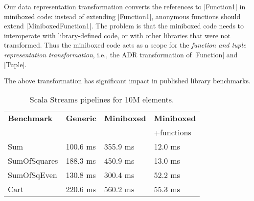 Our data representation transformation converts the references to
|Function1| in miniboxed code: instead of extending |Function1|,
anonymous functions should extend |MiniboxedFunction1|. The
problem is that the miniboxed code needs to interoperate with
library-defined code, or with other libraries that were not
transformed. Thus the miniboxed code acts
as a scope for the \emph{function and tuple representation
  transformation}, i.e., the ADR transformation of |Function| and
|Tuple|.


The above transformation has significant impact in published library benchmarks.

\begin{table}[t]
  \begin{tabularx}{0.48\textwidth}{|g *{3}{|Y}|} \hline
    \textbf{Benchmark} & \textbf{Generic} & \textbf{Miniboxed}& \textbf{Miniboxed} \\
                       &                  &                   & +functions \\ \hline
    Sum              &              100.6 ms &              355.9 ms &             12.0 ms \\
    SumOfSquares     &              188.3 ms &              450.9 ms &             13.0 ms \\
    SumOfSqEven      &              130.8 ms &              300.4 ms &             52.2 ms \\
    Cart             &              220.6 ms &              560.2 ms &             55.3 ms \\ \hline
  \end{tabularx}
  \vspace{-2mm}
  \caption{Scala Streams pipelines for 10M elements.}
  \label{table:streams}
  \vspace{-1em}
\end{table}


